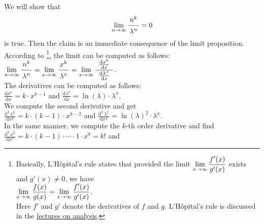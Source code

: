 \proof  We will show that 
\hspace*{1.3cm} 
\begin{equation}
  \label{eq:star}
  \lim\limits_{n \rightarrow \infty} \bruch{n^{k}}{\lambda^n} = 0  
\end{equation}
is true.  Then the claim is an immediate consequence of the limit proposition. 
According to \footnote{Basically, L'H\^opital's rule states that provided the
  limit $\displaystyle \lim\limits_{x \rightarrow \infty} \frac{f'(x)}{g'(x)}$ exists and $g'(x) \not= 0$, we have
  \\
  \hspace*{1.3cm}
  $\displaystyle\lim\limits_{x \rightarrow \infty} \frac{f(x)}{g(x)} = \lim\limits_{x \rightarrow \infty} \frac{f'(x)}{g'(x)}$.
  \\[0.2cm]
  Here $f'$ and $g'$ denote the derivatives of $f$ and $g$. 
  L'H\^opital's rule is discussed in the \href{https://github.com/karlstroetmann/Analysis/blob/master/Skript/analysis.pdf}{lectures on analysis}.
},  
the limit can be computed as follows: \\[0.2cm]
\hspace*{1.3cm} 
$\displaystyle \lim\limits_{n \rightarrow \infty} \bruch{n^{k}}{\lambda^n} =
\lim\limits_{x \rightarrow \infty} \bruch{x^{k}}{\lambda^x} =
\lim\limits_{x \rightarrow \infty} \bruch{\;\frac{\mathrm{d}x^{k}}{\mathrm{d}x}\;}{\frac{\mathrm{d}\lambda^x}{\mathrm{d}x}}$.
\\[0.2cm]
The derivatives can be computed as follows: \\[0.2cm]
\hspace*{1.3cm}
 $\displaystyle \frac{\mathrm{d}x^{k}}{\mathrm{d}x} = k \cdot x^{k-1}$ \quad and \quad 
 $\displaystyle \frac{\mathrm{d}\lambda^{x}}{\mathrm{d}x} = \ln(\lambda) \cdot \lambda^x$. \\[0.2cm]
We compute the second derivative and get \\[0.2cm]
\hspace*{1.3cm}  
$\displaystyle \frac{\mathrm{d}^{2}\,x^{k}}{\mathrm{d}x^2} = k \cdot (k-1) \cdot x^{k-2}$ \quad and \quad 
 $\displaystyle \frac{\mathrm{d}^2\,\lambda^{x}}{\mathrm{d}x^2} = \ln(\lambda)^2 \cdot \lambda^x$. \\[0.2cm]
In the same manner, we compute the $k$-th order derivative and find \\[0.2cm]
\hspace*{1.3cm} 
$\displaystyle \frac{\mathrm{d}^{k}\,x^{k}}{\mathrm{d}x^k} = k \cdot (k-1) \cdot \cdots \cdot 1 \cdot x^{0} = k!$ \quad and \quad 
